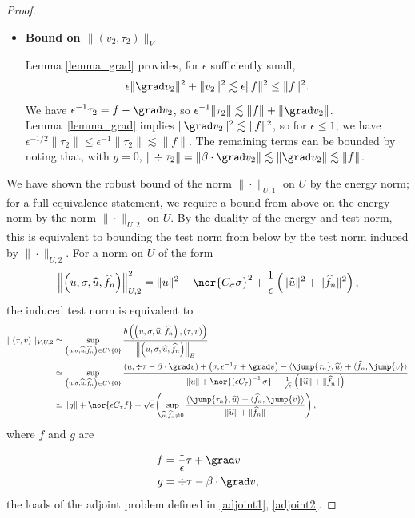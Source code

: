 \begin{proof}
\begin{itemize}
\item \textbf{Bound on $\|\left(v_{2},\tau_{2}\right)\|_V$}

Lemma \ref{lemma_grad} provides, for $\epsilon$ sufficiently small, 
\[
\epsilon \|\grad v_2\|^2 + \|v_2\|^2 \lesssim  \epsilon \| f\|^2 \leq \|f\|^2.
\]
We have $\epsilon^{-1}\tau_2 = f - \grad v_2$, so $\epsilon^{-1} \|\tau_2\| \lesssim \|f\| + \|\grad v_2\|$. Lemma~\ref{lemma_grad} implies $\|\grad v_2\|^2  \lesssim  \| f\|^2$, so for $\epsilon \leq 1$, we have $\epsilon^{-1/2}\|\tau_2\| \leq \epsilon^{-1}\|\tau_2\| \lesssim \|f\|$.  The remaining terms can be bounded by noting that, with $g = 0$, $\|\div \tau_2\| = \|\beta\cdot \grad v_2\| \lesssim \|\grad v_2\| \lesssim \|f\| $.
\end{itemize}

We have shown the robust bound of the norm $\|\cdot \|_{U,1}$ on $U$ by the energy norm; for a full equivalence statement, we require a bound from above on the energy norm by the norm $\|\cdot \|_{U,2}$ on $U$.  By the duality of the energy and test norm, this is equivalent to bounding the test norm from below by the test norm induced by $\|\cdot \|_{U,2}$. 
For a norm on $U$ of the form
\[
\left\|\left(u,\sigma,\widehat{u},\widehat{f}_n\right)\right\|_{U,2}^2 = \|u\|^2 + \nor{C_\sigma \sigma}^2 + \frac{1}{{\epsilon}}\left( \|\widehat{u}\|^2 + \|\widehat{f}_n\|^2\right),
\]
the induced test norm is equivalent to
\begin{align*}
\| \left(\tau,v\right) \|_{V,U,2} &\simeq \sup_{\left(u,\sigma,\widehat{u},\widehat{f}_n\right) \in U\setminus \{0\}} \frac{b\left(\left(u,\sigma,\widehat{u},\widehat{f}_n\right),\left(\tau,v\right)\right)}{\left\|\left(u,\sigma,\widehat{u},\widehat{f}_n\right)\right\|_E} \\
&\simeq \sup_{\left(u,\sigma,\widehat{u},\widehat{f}_n\right) \in U\setminus \{0\}} \frac{\left(u,\div \tau - \beta \cdot \grad v\right) + \left(\sigma, \epsilon^{-1} \tau + \grad v\right) - \langle \jump{\tau_n}, \widehat{u} \rangle + \langle \widehat{f}_n, \jump{v} \rangle
}{\|u\| + \nor{\left(\epsilon C_\tau\right)^{-1}\sigma} + \frac{1}{\sqrt{\epsilon}}\left(  \|\widehat{u}\| + \|\widehat{f}_n\| \right)} \\
&\simeq \|g\| + \nor{\epsilon C_\tau f} + {\sqrt{\epsilon}}\left(\sup_{\widehat{u},\widehat{f}_n \neq 0}\frac{\langle \jump{\tau_n}, \widehat{u} \rangle + \langle \widehat{f}_n, \jump{v} \rangle}{\|\widehat{u}\| + \|\widehat{f}_n\|}\right),
\end{align*}
where $f$ and $g$ are 
\begin{align*}
f &= \frac{1}{\epsilon}\tau + \grad v\\
g &= \div \tau - \beta \cdot \grad v,
\end{align*}
the loads of the adjoint problem defined in \eqref{adjoint1}, \eqref{adjoint2}.  


\end{proof}
